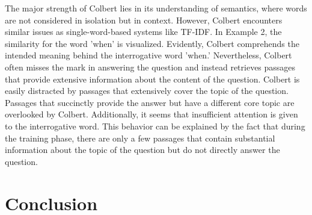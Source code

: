 \documentclass{article}
\begin{document}
 The major strength of Colbert lies in its understanding of semantics, where words are not considered in isolation but in context. However, Colbert encounters similar issues as single-word-based systems like TF-IDF. In Example 2, the similarity for the word 'when' is visualized. Evidently, Colbert comprehends the intended meaning behind the interrogative word 'when.' Nevertheless, Colbert often misses the mark in answering the question and instead retrieves passages that provide extensive information about the content of the question. Colbert is easily distracted by passages that extensively cover the topic of the question. Passages that succinctly provide the answer but have a different core topic are overlooked by Colbert. Additionally, it seems that insufficient attention is given to the interrogative word.
 This behavior can be explained by the fact that during the training phase, there are only a few passages that contain substantial information about the topic of the question but do not directly answer the question.
 
%
%
%
%
%

\section{Conclusion}





\end{document}
